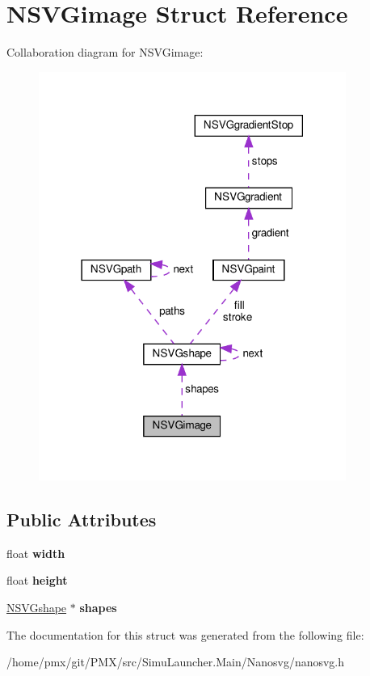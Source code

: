 \hypertarget{structNSVGimage}{}\section{N\+S\+V\+Gimage Struct Reference}
\label{structNSVGimage}


Collaboration diagram for N\+S\+V\+Gimage\+:
\nopagebreak
\begin{figure}[H]
\begin{center}
\leavevmode
\includegraphics[width=285pt]{structNSVGimage__coll__graph}
\end{center}
\end{figure}
\subsection*{Public Attributes}
\begin{DoxyCompactItemize}
\item 
\mbox{\label{structNSVGimage_a09e04e73bf36578099e2f678494aba64}} 
float {\bfseries width}
\item 
\mbox{\label{structNSVGimage_a1940399638cc3a962fa9255c10e3daf4}} 
float {\bfseries height}
\item 
\mbox{\label{structNSVGimage_af1c994285b47d78661b631f9ce43d7c8}} 
\hyperlink{structNSVGshape}{N\+S\+V\+Gshape} $\ast$ {\bfseries shapes}
\end{DoxyCompactItemize}


The documentation for this struct was generated from the following file\+:\begin{DoxyCompactItemize}
\item 
/home/pmx/git/\+P\+M\+X/src/\+Simu\+Launcher.\+Main/\+Nanosvg/nanosvg.\+h\end{DoxyCompactItemize}

